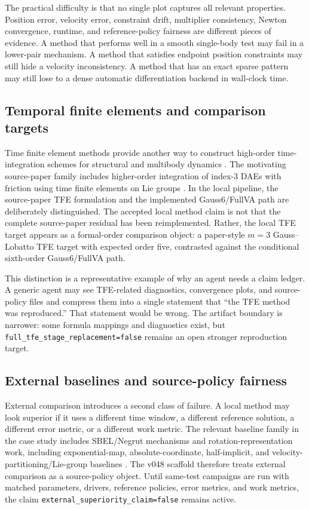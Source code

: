 \documentclass[10pt]{article}
\newcommand{\method}{Gauss6/FullVA}
\begin{document}
The practical difficulty is that no single plot captures all relevant
properties. Position error, velocity error, constraint drift, multiplier
consistency, Newton convergence, runtime, and reference-policy fairness are
different pieces of evidence. A method that performs well in a smooth
single-body test may fail in a lower-pair mechanism. A method that satisfies
endpoint position constraints may still hide a velocity inconsistency. A method
that has an exact sparse pattern may still lose to a dense automatic
differentiation backend in wall-clock time.

\subsection{Temporal finite elements and comparison targets}

Time finite element methods provide another way to construct high-order
time-integration schemes for structural and multibody dynamics
\cite{borri1988rigid,hughes1988spacetime,hulbert1992time,jog2016robust,bauchau2024time}.
The motivating source-paper family includes higher-order integration of
index-3 DAEs with friction using time finite elements on Lie groups
\cite{chaturvedi2026tfe}. In the local pipeline, the source-paper TFE
formulation and the implemented \method{} path are deliberately distinguished.
The accepted local method claim is not that the complete source-paper residual
has been reimplemented. Rather, the local TFE target appears as a formal-order
comparison object: a paper-style $m=3$ Gauss--Lobatto TFE target with expected
order five, contrasted against the conditional sixth-order \method{} path.

This distinction is a representative example of why an agent needs a claim
ledger. A generic agent may see TFE-related diagnostics, convergence plots, and
source-policy files and compress them into a single statement that ``the TFE
method was reproduced.'' That statement would be wrong. The artifact boundary
is narrower: some formula mappings and diagnostics exist, but
\texttt{full\_tfe\_stage\_replacement=false} remains an open stronger
reproduction target.

\subsection{External baselines and source-policy fairness}

External comparison introduces a second class of failure. A local method may
look superior if it uses a different time window, a different reference
solution, a different error metric, or a different work metric. The relevant
baseline family in the case study includes SBEL/Negrut mechanisms and
rotation-representation work, including exponential-map, absolute-coordinate,
half-implicit, and velocity-partitioning/Lie-group baselines
\cite{taves2020exponential,kissel2021dwelling,kissel2022absolute,fang2023halfimplicit,kissel2024velocitypartitioning}.
The v048 scaffold therefore treats external comparison as a source-policy
object. Until same-test campaigns are run with matched parameters, drivers,
reference policies, error metrics, and work metrics, the claim
\texttt{external\_superiority\_claim=false} remains active.
\end{document}
